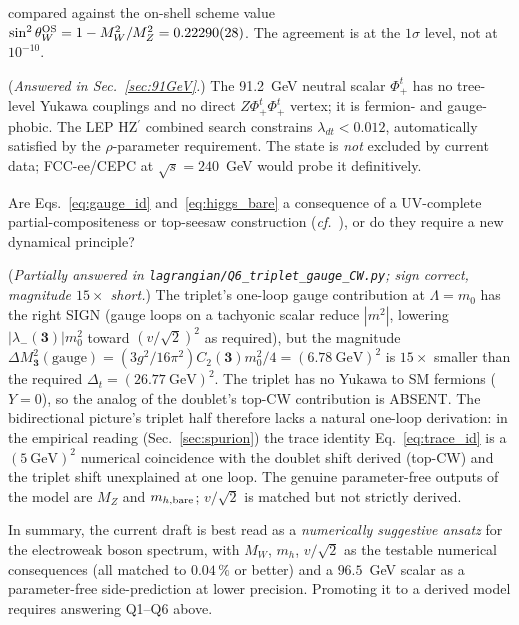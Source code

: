 \documentclass[11pt,a4paper]{article}
\newcommand{\mt}{\mathbf{3}}
\newcommand{\Cas}{C_2}
\begin{document}
\begin{description}
  compared against the on-shell scheme value
  $\sin^2\theta_W^{\rm OS} = 1 - M_W^2/M_Z^2 = 0.22290(28)$. The
  agreement is at the $1\sigma$ level, not at $10^{-10}$.
\item[Q4.] (\emph{Answered in Sec.~\ref{sec:91GeV}.}) The 91.2~GeV
  neutral scalar $\Phi^t_+$ has no tree-level Yukawa couplings and no
  direct $Z\Phi^t_+\Phi^t_+$ vertex; it is fermion- and gauge-phobic.
  The LEP HZ$^\prime$ combined search constrains
  $\lambda_{dt} < 0.012$, automatically satisfied by the
  $\rho$-parameter requirement. The state is \emph{not} excluded by
  current data; FCC-ee/CEPC at $\sqrt{s} = 240$~GeV would probe it
  definitively.
\item[Q5.] Are Eqs.~\eqref{eq:gauge_id} and~\eqref{eq:higgs_bare} a
  consequence of a UV-complete partial-compositeness or top-seesaw
  construction (\textit{cf.}~\cite{Caracciolo2012, Chivukula1998}), or
  do they require a new dynamical principle?
\item[Q6.] (\emph{Partially answered in
  \texttt{lagrangian/Q6\_triplet\_gauge\_CW.py}; sign correct,
  magnitude $15\times$ short.}) The triplet's one-loop gauge
  contribution at $\Lambda = m_0$ has the right SIGN (gauge loops on
  a tachyonic scalar reduce $|m^2|$, lowering $|\lambda_-(\mt)|m_0^2$
  toward $(v/\sqrt{2})^2$ as required), but the magnitude $\Delta
  M_\mt^2(\text{gauge}) = (3 g^2/16\pi^2) \Cas(\mt) m_0^2 / 4 = (6.78~
  \text{GeV})^2$ is $15\times$ smaller than the required $\Delta_t =
  (26.77~\text{GeV})^2$. The triplet has no Yukawa to SM fermions
  ($Y=0$), so the analog of the doublet's top-CW contribution is
  ABSENT. The bidirectional picture's triplet half therefore lacks a
  natural one-loop derivation: in the empirical reading
  (Sec.~\ref{sec:spurion}) the trace identity Eq.~\eqref{eq:trace_id}
  is a $(5~\text{GeV})^2$ numerical coincidence with the doublet
  shift derived (top-CW) and the triplet shift unexplained at one
  loop. The genuine parameter-free outputs of the model are $M_Z$
  and $m_{h,\rm bare}$; $v/\sqrt{2}$ is matched but not strictly
  derived.
\end{description}

In summary, the current draft is best read as a \emph{numerically
suggestive ansatz} for the electroweak boson spectrum, with $M_W$,
$m_h$, $v/\sqrt{2}$ as the testable numerical consequences (all
matched to $0.04\,\%$ or better) and a $96.5$~GeV scalar as a
parameter-free side-prediction at lower precision. Promoting it to a
derived model requires answering Q1--Q6 above.
\end{document}
